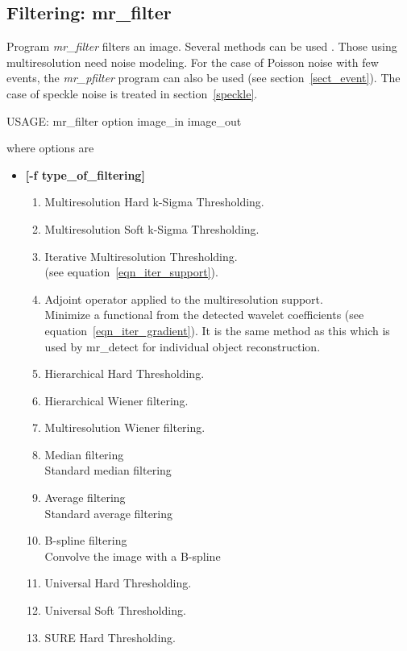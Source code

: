 \begin{itemize}
\newpage

\section{Filtering: mr\_filter}
\label{sect_filter}
Program 
{\em mr\_filter} filters an image. Several methods can be used \cite{starck:sta94_4,starck:sta94_5,starck:sta94_1}. Those using
multiresolution need noise modeling. For the case of Poisson noise with
few events, the {\em mr\_pfilter} program can also 
be used (see section~\ref{sect_event}). The case of speckle noise is 
treated in section~\ref{speckle}.
{\bf
\begin{center}
 USAGE: mr\_filter option image\_in image\_out
\end{center}}
where options are 
\begin{itemize}
\baselineskip=0.4truecm
\itemsep=0.1truecm
\item {\bf [-f type\_of\_filtering]} 
\begin{enumerate}
\baselineskip=0.4truecm
\item Multiresolution Hard k-Sigma Thresholding.
\item Multiresolution Soft k-Sigma Thresholding.
\item Iterative Multiresolution Thresholding. \\
(see equation~\ref{eqn_iter_support}).
\item Adjoint operator applied to the multiresolution support. \\
Minimize a functional from the detected wavelet coefficients
(see equation~\ref{eqn_iter_gradient}). It is the 
same method as this which is used by {mr\_detect} for individual object 
reconstruction.
\item Hierarchical Hard Thresholding.
\item Hierarchical Wiener filtering.
\item Multiresolution Wiener filtering.
\item Median filtering \\
Standard median filtering
\item Average filtering \\
Standard average filtering
\item B-spline filtering \\
Convolve the image with a B-spline
\item  Universal Hard Thresholding.
\item  Universal Soft Thresholding.
\item SURE Hard Thresholding.

\end{enumerate}
\end{itemize}
\end{itemize}
